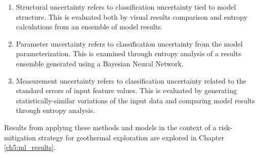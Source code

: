 \begin{enumerate}
    \item Structural uncertainty refers to classification uncertainty tied to model structure. This is evaluated both by visual results comparison and entropy calculations from an ensemble of model results.
    \item Parameter uncertainty refers to classification uncertainty from the model parameterization. This is examined through entropy analysis of a results ensemble generated using a Bayesian Neural Network.
    \item Measurement uncertainty refers to classification uncertainty related to the standard errors of input feature values. This is evaluated by generating statistically-similar variations of the input data and comparing model results through entropy analysis. 
\end{enumerate}

Results from applying these methods and models in the context of a risk-mitigation strategy for geothermal exploration are explored in Chapter \ref{ch5:ml_results}.